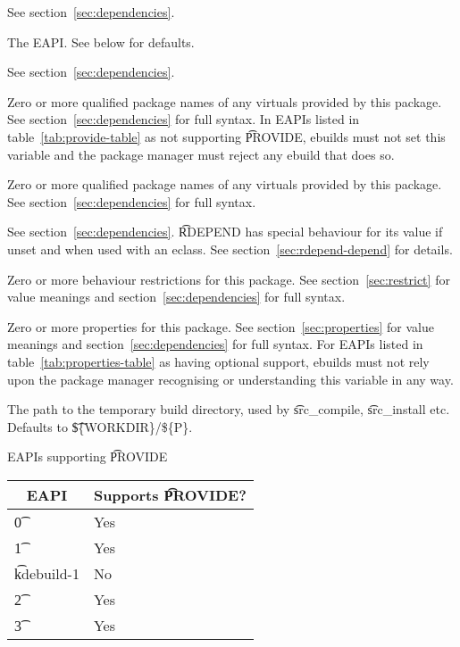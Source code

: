 \begin{description}
\item[DEPEND] See section~\ref{sec:dependencies}.
\item[EAPI] The EAPI. See below for defaults.
\item[PDEPEND] See section~\ref{sec:dependencies}.
\IFKDEBUILDELSE
{
    \item[PROVIDE] Zero or more qualified package names of any 
        virtuals provided by this package. See section~\ref{sec:dependencies} for full syntax.  In EAPIs
        listed in table~\ref{tab:provide-table} as not supporting \t{PROVIDE}, ebuilds must not set this
        variable and the package manager must reject any ebuild that does so.
        \label{ebuild-var-provide}
}{
    \item[PROVIDE] Zero or more qualified package names of any 
        virtuals provided by this package. See section~\ref{sec:dependencies} for full syntax.
        \label{ebuild-var-provide}
}
\item[RDEPEND] See section~\ref{sec:dependencies}. \t{RDEPEND} has special behaviour for its value if
    unset and when used with an eclass. See section~\ref{sec:rdepend-depend} for details.
\item[RESTRICT] Zero or more behaviour restrictions for this package. See section~\ref{sec:restrict}
    for value meanings and section~\ref{sec:dependencies} for full syntax.
\item[PROPERTIES] Zero or more properties for this package. See section~\ref{sec:properties}
    for value meanings and section~\ref{sec:dependencies} for full syntax. For EAPIs listed in
    table~\ref{tab:properties-table} as having optional support, ebuilds must not rely upon the
    package manager recognising or understanding this variable in any way.
\item[S] The path to the temporary build directory, used by \t{src\_compile}, \t{src\_install}
    etc. Defaults to \t{\$\{WORKDIR\}/\$\{P\}}.
\end{description}

\IFKDEBUILDELSE
{
    \begin{centertable}{EAPIs supporting \t{PROVIDE}} \label{tab:provide-table}
    \begin{tabular}{ l l }
        \toprule
        \multicolumn{1}{c}{\textbf{EAPI}} &
        \multicolumn{1}{c}{\textbf{Supports \t{PROVIDE}?}} \\
        \midrule
    \t{0} & Yes \\
    \t{1} & Yes \\
    \t{kdebuild-1} & No \\
    \t{2} & Yes \\
    \t{3} & Yes \\
    \bottomrule
    \end{tabular}
    \end{centertable}
}{
}

